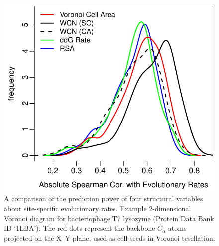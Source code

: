 \documentclass[11pt]{article}
\begin{document}
    \begin{figure}[tbh]
        \begin{center}
        \includegraphics[width=6.9in]{best_structural_predictors_of_ER.pdf}
        \end{center}
        \caption{A comparison of the prediction power of four structural variables about site-specific evolutionary rates. Example 2-dimensional Voronoi diagram for bacteriophage T7 lysozyme (Protein Data Bank ID `1LBA'). The red dots represent the backbone $C_\alpha$ atoms projected on the X--Y plane, used as cell seeds in Voronoi tesellation.}
        \label{fig:best_predictor}
    \end{figure}




\end{document}
